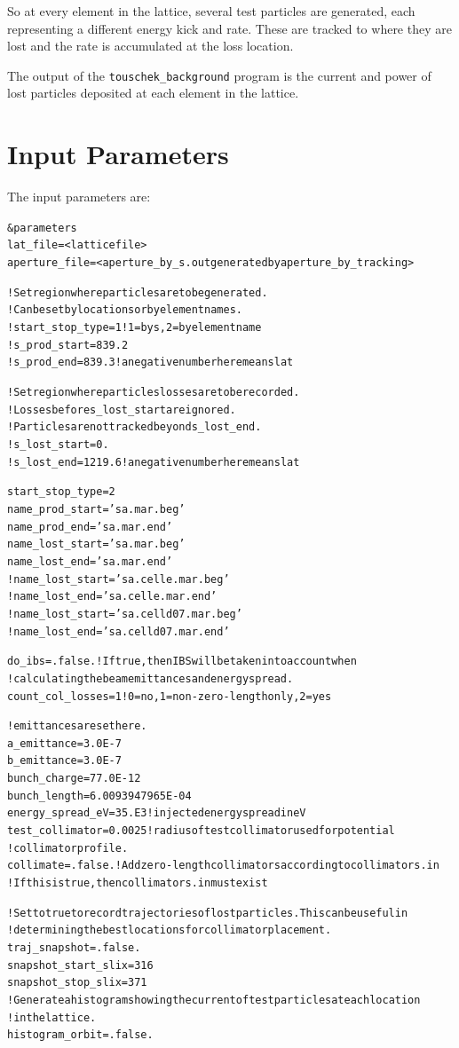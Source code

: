 \documentclass[11pt]{article}
\newlength{\ExBeg}
\newlength{\ExEnd}
\newenvironment{example}
  {\vspace{\ExBeg} \begin{alltt}}
  {\end{alltt} \vspace{\ExEnd}}
\begin{document}
So at every element in the lattice, several test particles are generated, each representing 
a different energy kick and rate.  These are tracked to where they are lost and the rate is accumulated
at the loss location.

The output of the {\tt touschek_background} program is the current and power of lost particles deposited
at each element in the lattice.

\section{Input Parameters}
The input parameters are:
\begin{example}
\&parameters
  lat_file = <lattice file>
  aperture_file = <aperture_by_s.out generated by aperture_by_tracking>

	! Set region where particles are to be generated.
	! Can be set by location s or by element names.
  ! start_stop_type = 1 !1=by s, 2=by element name
  ! s_prod_start = 839.2
  ! s_prod_end = 839.3  !a negative number here means lat%

	! Set region where particles losses are to be recorded.
	! Losses before s_lost_start are ignored.
	! Particles are not tracked beyond s_lost_end.
  ! s_lost_start = 0.
  ! s_lost_end = 1219.6  !a negative number here means lat%

  start_stop_type = 2
  name_prod_start = 'sa.mar.beg'
  name_prod_end   = 'sa.mar.end'
  name_lost_start = 'sa.mar.beg'
  name_lost_end   = 'sa.mar.end'
  !name_lost_start = 'sa.celle.mar.beg'
  !name_lost_end   = 'sa.celle.mar.end'
  !name_lost_start = 'sa.celld07.mar.beg'
  !name_lost_end   = 'sa.celld07.mar.end'

  do_ibs = .false. !If true, then IBS will be taken into account when
                   !calculating the beam emittances and energy spread.
  count_col_losses = 1 ! 0=no, 1=non-zero-length only, 2 = yes

  ! emittances are set here.
  a_emittance = 3.0E-7
  b_emittance = 3.0E-7
  bunch_charge = 77.0E-12
  bunch_length = 6.0093947965E-04
  energy_spread_eV = 35.E3    !injected energy spread in eV
  test_collimator = 0.0025    !radius of test collimator used for potential 
                              ! collimator profile.
  collimate = .false.  !Add zero-length collimators according to collimators.in
                       !If this is true, then collimators.in must exist

  ! Set to true to record trajectories of lost particles.  This can be useful in 
  ! determining the best locations for collimator placement.
  traj_snapshot = .false.
  snapshot_start_slix = 316
  snapshot_stop_slix = 371
  ! Generate a histogram showing the current of test particles at each location
  ! in the lattice.
  histogram_orbit = .false.


\end{example}
\end{document}
